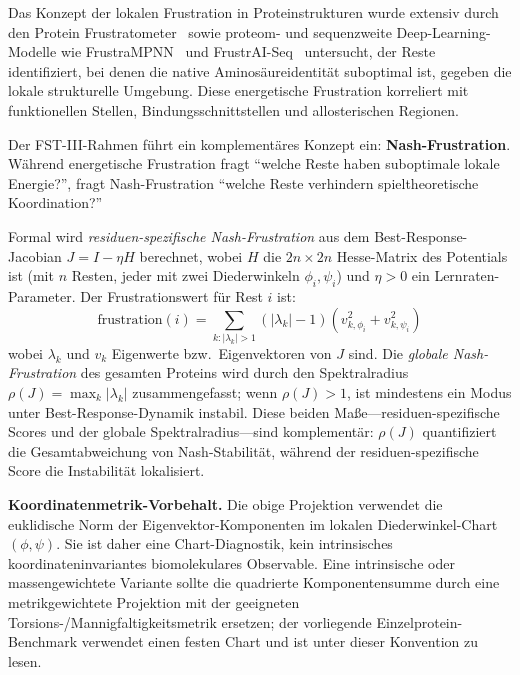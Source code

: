 \documentclass[12pt,a4paper]{article}
\theoremstyle{remark}
\begin{document}
Das Konzept der lokalen Frustration in Proteinstrukturen wurde extensiv durch den Protein Frustratometer~\citep{Ferreiro2007,Ferreiro2014} sowie proteom- und sequenzweite Deep-Learning-Modelle wie FrustraMPNN~\citep{Beining2026} und FrustrAI-Seq~\citep{Leusch2026} untersucht, der Reste identifiziert, bei denen die native Aminosäureidentität suboptimal ist, gegeben die lokale strukturelle Umgebung. Diese energetische Frustration korreliert mit funktionellen Stellen, Bindungsschnittstellen und allosterischen Regionen.

Der FST-III-Rahmen führt ein komplementäres Konzept ein: \textbf{Nash-Frustration}. Während energetische Frustration fragt ``welche Reste haben suboptimale lokale Energie?'', fragt Nash-Frustration ``welche Reste verhindern spieltheoretische Koordination?''

Formal wird \emph{residuen-spezifische Nash-Frustration} aus dem Best-Response-Jacobian $J = I - \eta H$ berechnet, wobei $H$ die $2n \times 2n$ Hesse-Matrix des Potentials ist (mit $n$ Resten, jeder mit zwei Diederwinkeln $\phi_i, \psi_i$) und $\eta > 0$ ein Lernraten-Parameter. Der Frustrationswert für Rest $i$ ist:
\begin{equation}
\text{frustration}(i) = \sum_{k: |\lambda_k| > 1} (|\lambda_k| - 1) \left( v_{k,\phi_i}^2 + v_{k,\psi_i}^2 \right)
\end{equation}
wobei $\lambda_k$ und $v_k$ Eigenwerte bzw.\ Eigenvektoren von $J$ sind. Die \emph{globale Nash-Frustration} des gesamten Proteins wird durch den Spektralradius $\rho(J) = \max_k |\lambda_k|$ zusammengefasst; wenn $\rho(J) > 1$, ist mindestens ein Modus unter Best-Response-Dynamik instabil. Diese beiden Maße---residuen-spezifische Scores und der globale Spektralradius---sind komplementär: $\rho(J)$ quantifiziert die Gesamtabweichung von Nash-Stabilität, während der residuen-spezifische Score die Instabilität lokalisiert.

\textbf{Koordinatenmetrik-Vorbehalt.}
Die obige Projektion verwendet die euklidische Norm der Eigenvektor-Komponenten im lokalen Diederwinkel-Chart $(\phi,\psi)$. Sie ist daher eine Chart-Diagnostik, kein intrinsisches koordinateninvariantes biomolekulares Observable. Eine intrinsische oder massengewichtete Variante sollte die quadrierte Komponentensumme durch eine metrikgewichtete Projektion mit der geeigneten Torsions-/Mannigfaltigkeitsmetrik ersetzen; der vorliegende Einzelprotein-Benchmark verwendet einen festen Chart und ist unter dieser Konvention zu lesen.
\end{document}
